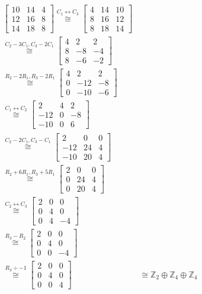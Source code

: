 	\begin{align*}
	\begin{bmatrix}
	10 & 14 & 4 \\
	12 & 16 & 8 \\
	14 & 18 & 8
	\end{bmatrix} \stackrel{C_1\leftrightarrow C_3}{\cong} 
	\begin{bmatrix}
	4 & 14 & 10 \\
	8 & 16 & 12 \\
	8 & 18 & 14
	\end{bmatrix}& \\  \stackrel{C_2 - 3C_1, C_3 - 2C_1}{\cong} 
	\begin{bmatrix}
	4 & 2 & 2 \\
	8 & -8 & -4 \\
	8 & -6 & -2
	\end{bmatrix}& \\ \stackrel{R_2 - 2R_1, R_3 - 2R_1}{\cong}
	\begin{bmatrix}
	4 & 2 & 2 \\
	0 & -12 & -8 \\
	0 & -10 & -6
	\end{bmatrix}& \\ \stackrel{C_1\leftrightarrow C_2}{\cong} 
	\begin{bmatrix}
	2 & 4 & 2 \\
	-12 & 0 & -8 \\
	-10 & 0 & 6
	\end{bmatrix}& \\ \stackrel{C_2 - 2C_1, C_3 - C_1}{\cong} 
	\begin{bmatrix}
	2 & 0 & 0 \\
	-12 & 24 & 4 \\
	-10 & 20 & 4
	\end{bmatrix}& \\ \stackrel{R_2 + 6R_1, R_3 + 5R_1}{\cong} 
	\begin{bmatrix}
	2 & 0 & 0 \\
	0 & 24 & 4 \\
	0 & 20 & 4
	\end{bmatrix}& \\ \stackrel{C_2\leftrightarrow C_3}{\cong} 
	\begin{bmatrix}
	2 & 0 & 0 \\
	0 & 4 & 0 \\
	0 & 4 & -4
	\end{bmatrix}& \\ \stackrel{R_3 - R_2}{\cong} 
	\begin{bmatrix}
	2 & 0 & 0 \\
	0 & 4 & 0 \\
	0 & 0 & -4 
	\end{bmatrix}& \\ \stackrel{R_3\div-1}{\cong} 
	\begin{bmatrix}
	2 & 0 & 0 \\
	0 & 4 & 0 \\
	0 & 0 & 4
	\end{bmatrix}& \cong \mathbb{Z}_2\oplus\mathbb{Z}_4\oplus\mathbb{Z}_4
	\end{align*}
